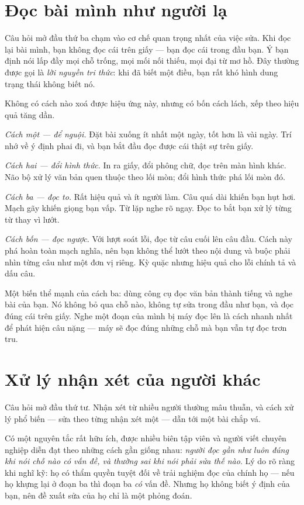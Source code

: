 \documentclass[../../english.tex]{subfiles}
\begin{document}
\section{Đọc bài mình như người lạ}

Câu hỏi mở đầu thứ ba chạm vào cơ chế quan trọng nhất của việc sửa. Khi đọc lại bài mình, bạn không đọc cái trên giấy --- bạn đọc cái trong đầu bạn. Ý bạn định nói lấp đầy mọi chỗ trống, mọi mối nối thiếu, mọi đại từ mơ hồ. Đây thường được gọi là \emph{lời nguyền tri thức}: khi đã biết một điều, bạn rất khó hình dung trạng thái không biết nó.

Không có cách nào xoá được hiệu ứng này, nhưng có bốn cách lách, xếp theo hiệu quả tăng dần.

\emph{Cách một --- để nguội.} Đặt bài xuống ít nhất một ngày, tốt hơn là vài ngày. Trí nhớ về ý định phai đi, và bạn bắt đầu đọc được cái thật sự trên giấy.

\emph{Cách hai --- đổi hình thức.} In ra giấy, đổi phông chữ, đọc trên màn hình khác. Não bộ xử lý văn bản quen thuộc theo lối mòn; đổi hình thức phá lối mòn đó.

\emph{Cách ba --- đọc to.} Rất hiệu quả và ít người làm. Câu quá dài khiến bạn hụt hơi. Mạch gãy khiến giọng bạn vấp. Từ lặp nghe rõ ngay. Đọc to bắt bạn xử lý từng từ thay vì lướt.

\emph{Cách bốn --- đọc ngược.} Với lượt soát lỗi, đọc từ câu cuối lên câu đầu. Cách này phá hoàn toàn mạch nghĩa, nên bạn không thể lướt theo nội dung và buộc phải nhìn từng câu như một đơn vị riêng. Kỳ quặc nhưng hiệu quả cho lỗi chính tả và dấu câu.

\begin{cannho}
Một biến thể mạnh của cách ba: dùng công cụ đọc văn bản thành tiếng và nghe bài của bạn. Nó không bỏ qua chỗ nào, không tự sửa trong đầu như bạn, và đọc đúng cái trên giấy. Nghe một đoạn của mình bị máy đọc lên là cách nhanh nhất để phát hiện câu nặng --- máy sẽ đọc đúng những chỗ mà bạn vẫn tự đọc trơn tru.
\end{cannho}

\section{Xử lý nhận xét của người khác}

Câu hỏi mở đầu thứ tư. Nhận xét từ nhiều người thường mâu thuẫn, và cách xử lý phổ biến --- sửa theo từng nhận xét một --- dẫn tới một bài chắp vá.

Có một nguyên tắc rất hữu ích, được nhiều biên tập viên và người viết chuyên nghiệp diễn đạt theo những cách gần giống nhau: \emph{người đọc gần như luôn đúng khi nói chỗ nào có vấn đề, và thường sai khi nói phải sửa thế nào}. Lý do rõ ràng khi nghĩ kỹ: họ có thẩm quyền tuyệt đối về trải nghiệm đọc của chính họ --- nếu họ khựng lại ở đoạn ba thì đoạn ba \emph{có} vấn đề. Nhưng họ không biết ý định của bạn, nên đề xuất sửa của họ chỉ là một phỏng đoán.
\end{document}

